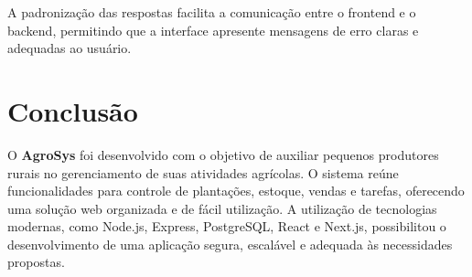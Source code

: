 \documentclass[12pt]{article}
\begin{document}
A padronização das respostas facilita a comunicação entre o frontend e o backend, permitindo que a interface apresente mensagens de erro claras e adequadas ao usuário.


\section{Conclusão}

O \textbf{AgroSys} foi desenvolvido com o objetivo de auxiliar pequenos produtores rurais no gerenciamento de suas atividades agrícolas. O sistema reúne funcionalidades para controle de plantações, estoque, vendas e tarefas, oferecendo uma solução web organizada e de fácil utilização. A utilização de tecnologias modernas, como Node.js, Express, PostgreSQL, React e Next.js, possibilitou o desenvolvimento de uma aplicação segura, escalável e adequada às necessidades propostas.


% 
% 
\end{document}
